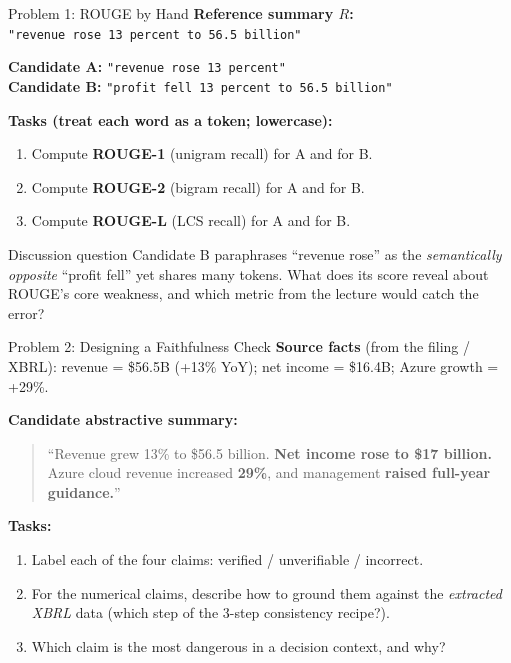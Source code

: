 \documentclass[9pt,t]{beamer}
\begin{document}
\begin{frame}{Problem 1: ROUGE by Hand}
\textbf{Reference summary $R$:}\\
\texttt{"revenue rose 13 percent to 56.5 billion"}

\medskip
\textbf{Candidate A:} \texttt{"revenue rose 13 percent"}\\
\textbf{Candidate B:} \texttt{"profit fell 13 percent to 56.5 billion"}

\medskip
\textbf{Tasks (treat each word as a token; lowercase):}
\begin{enumerate}
  \item[\textbf{A.}] Compute \textbf{ROUGE-1} (unigram recall) for A and for B.
  \item[\textbf{B.}] Compute \textbf{ROUGE-2} (bigram recall) for A and for B.
  \item[\textbf{C.}] Compute \textbf{ROUGE-L} (LCS recall) for A and for B.
\end{enumerate}

\medskip
\begin{block}{Discussion question}
Candidate B paraphrases ``revenue rose'' as the \emph{semantically opposite}
``profit fell'' yet shares many tokens. What does its score reveal about ROUGE's
core weakness, and which metric from the lecture would catch the error?
\end{block}
\end{frame}

\begin{frame}{Problem 2: Designing a Faithfulness Check}
\textbf{Source facts} (from the filing / XBRL):
revenue = \$56.5B (+13\% YoY); net income = \$16.4B; Azure growth = +29\%.

\medskip
\textbf{Candidate abstractive summary:}
\begin{quote}
``Revenue grew 13\% to \$56.5 billion. \textbf{Net income rose to \$17 billion.}
Azure cloud revenue increased \textbf{29\%}, and management \textbf{raised full-year
guidance.}''
\end{quote}

\medskip
\textbf{Tasks:}
\begin{enumerate}
  \item[\textbf{A.}] Label each of the four claims: verified / unverifiable / incorrect.
  \item[\textbf{B.}] For the numerical claims, describe how to ground them against the
        \emph{extracted XBRL} data (which step of the 3-step consistency recipe?).
  \item[\textbf{C.}] Which claim is the most dangerous in a decision context, and why?
\end{enumerate}
\end{frame}
\end{document}
